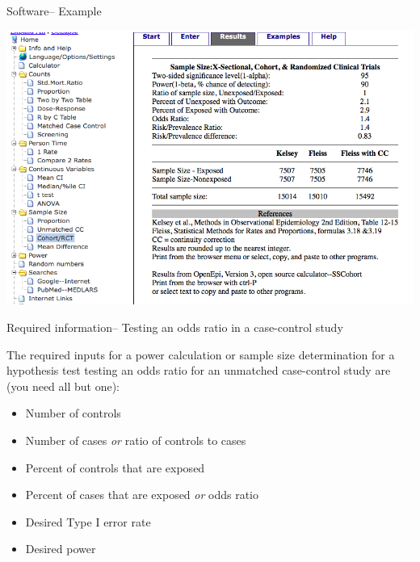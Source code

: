 \documentclass[ignorenonframetext,]{beamer}
\providecommand{\tightlist}{%
  \setlength{\itemsep}{0pt}\setlength{\parskip}{0pt}}
\begin{document}
\begin{frame}{Software-- Example}

\begin{center}\includegraphics[width=\textwidth]{images/open_epi_results} \end{center}

\end{frame}

\begin{frame}{Required information-- Testing an odds ratio in a
case-control study}

The required inputs for a power calculation or sample size determination
for a hypothesis test testing an odds ratio for an unmatched
case-control study are (you need all but one):

\begin{itemize}
\tightlist
\item
  Number of controls
\item
  Number of cases \emph{or} ratio of controls to cases
\item
  Percent of controls that are exposed
\item
  Percent of cases that are exposed \emph{or} odds ratio
\item
  Desired Type I error rate
\item
  Desired power
\end{itemize}

\end{frame}
\end{document}
